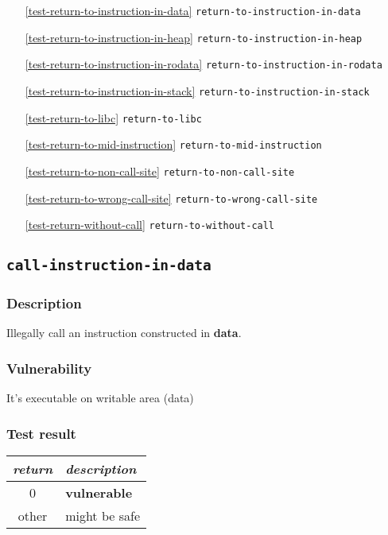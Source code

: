 \documentclass[a4paper]{book}
\begin{document}
\begin{itemize}[noitemsep]
\begin{itemize}[noitemsep, nolistsep, leftmargin=1em]
\begin{itemize}[noitemsep, nolistsep, leftmargin=1em]
    \item[\ref{test-return-to-instruction-in-data}]   \texttt{return-to-instruction-in-data}
    \item[\ref{test-return-to-instruction-in-heap}]   \texttt{return-to-instruction-in-heap}
    \item[\ref{test-return-to-instruction-in-rodata}] \texttt{return-to-instruction-in-rodata}
    \item[\ref{test-return-to-instruction-in-stack}]  \texttt{return-to-instruction-in-stack}
    \item[\ref{test-return-to-libc}]                  \texttt{return-to-libc}
    \item[\ref{test-return-to-mid-instruction}]       \texttt{return-to-mid-instruction}
    \item[\ref{test-return-to-non-call-site}]         \texttt{return-to-non-call-site}
    \item[\ref{test-return-to-wrong-call-site}]       \texttt{return-to-wrong-call-site}
    \item[\ref{test-return-without-call}]             \texttt{return-to-without-call}
    \end{itemize}
  \end{itemize}
\end{itemize}

\newpage
\subsection{\texttt{call-instruction-in-data}}\label{test-call-instruction-in-data}
\subsubsection{Description}
Illegally call an instruction constructed in \textbf{data}.
\subsubsection{Vulnerability}
It’s executable on writable area (data)
\subsubsection{Test result}
\begin{tabular}{cl}
  \toprule
  \emph{return}  & \emph{description} \\
  \midrule
  0              & \textbf{vulnerable} \\
  other          & might be safe \\
  \bottomrule
\end{tabular}
  
\end{document}
